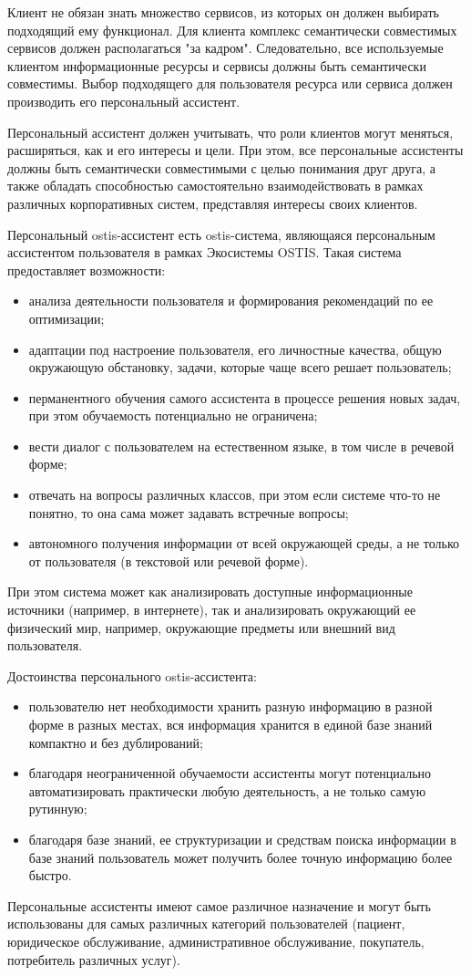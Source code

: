 Клиент не обязан знать множество сервисов, из которых он должен выбирать подходящий ему функционал. 
Для клиента комплекс семантически совместимых сервисов должен располагаться "за кадром"{}. 
Следовательно, все используемые клиентом информационные ресурсы и сервисы должны быть семантически совместимы. 
Выбор подходящего для пользователя ресурса или сервиса должен производить его персональный ассистент.

Персональный ассистент должен учитывать, что роли клиентов могут меняться, расширяться, как и его интересы и цели. 
При этом, все персональные ассистенты должны быть семантически совместимыми с целью понимания друг друга, а также обладать способностью самостоятельно взаимодействовать в рамках различных корпоративных систем, представляя интересы своих клиентов.

Персональный ostis-ассистент есть ostis-система, являющаяся персональным ассистентом пользователя в рамках Экосистемы OSTIS.
Такая система предоставляет возможности:
\begin{itemize}
    \item анализа деятельности пользователя и формирования рекомендаций по ее оптимизации;
    \item адаптации под настроение пользователя, его личностные качества, общую окружающую обстановку, задачи, которые чаще всего решает пользователь;
    \item перманентного обучения самого ассистента в процессе решения новых задач, при этом обучаемость потенциально не ограничена;
    \item вести диалог с пользователем на естественном языке, в том числе в речевой форме;
    \item отвечать на вопросы различных классов, при этом если системе что-то не понятно, то она сама может задавать встречные вопросы;
    \item автономного получения информации от всей окружающей среды, а не только от пользователя (в текстовой или речевой форме).
\end{itemize}

При этом система может как анализировать доступные информационные источники (например, в интернете), так и анализировать окружающий ее физический мир, например, окружающие предметы или внешний вид пользователя.

Достоинства персонального ostis-ассистента:
\begin{itemize}
    \item пользователю нет необходимости хранить разную информацию в разной форме в разных местах, вся информация хранится в единой базе знаний компактно и без дублирований;
    \item благодаря неограниченной обучаемости ассистенты могут потенциально автоматизировать практически любую деятельность, а не только самую рутинную;
    \item благодаря базе знаний, ее структуризации и средствам поиска информации в базе знаний пользователь может получить более точную информацию более быстро.
\end{itemize}

Персональные ассистенты имеют самое различное назначение и могут быть использованы для самых различных категорий пользователей (пациент, юридическое обслуживание, административное обслуживание, покупатель, потребитель различных услуг). 
